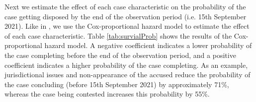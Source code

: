 Next we estimate the effect of each case characteristic on the probability of the case getting disposed by the end of the observation period (i.e. 15th September 2021). Like in \textcite{datta2017_itatDelays}, we use the Cox-proportional hazard model to estimate the effect of each case characteristic. Table \ref{tab:survialProb} shows the results of the Cox-proportional hazard model. A negative coefficient indicates a lower probability of the case completing before the end of the observation period, and a positive coefficient indicates a higher probability of the case completing. As an example, jurisdictional issues and non-appearance of the accused reduce the probability of the case concluding (before 15th September 2021) by approximately 71\%, whereas the case being contested increases this probability by 55\%.

